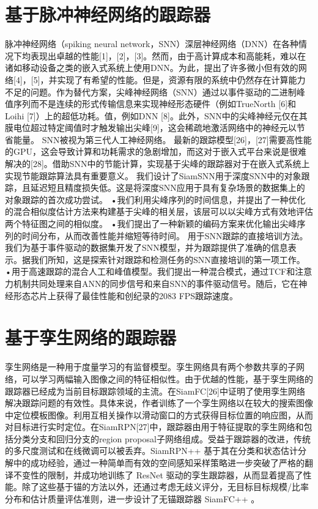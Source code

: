 \section{基于脉冲神经网络的跟踪器}%
脉冲神经网络（spiking neural network，SNN）深层神经网络（DNN）在各种情况下均表现出卓越的性能[1]，[2]，[3]。然而，由于高计算成本和高能耗，难以在诸如移动设备之类的嵌入式系统上使用DNN。为此，提出了许多微小但有效的网络[4]，[5]，并实现了有希望的性能。但是，资源有限的系统中仍然存在计算能力不足的问题。作为替代方案，尖峰神经网络（SNN）通过以事件驱动的二进制峰值序列而不是连续的形式传输信息来实现神经形态硬件（例如TrueNorth [6]和Loihi [7]）上的超低功耗。值，例如DNN [8]。此外，SNN中的尖峰神经元仅在其膜电位超过特定阈值时才触发输出尖峰[9]，这会稀疏地激活网络中的神经元以节省能量。 SNN被视为第三代人工神经网络。
最新的跟踪模型[26]，[27]需要高性能的GPU，这会导致计算和功耗需求的急剧增加，而这对于嵌入式平台来说是很难解决的[28]。借助SNN中的节能计算，实现基于尖峰的跟踪器对于在嵌入式系统上实现节能跟踪算法具有重要意义。\cite{SiamSNN} 我们设计了SiamSNN用于深度SNN中的对象跟踪，且延迟短且精度损失低。这是将深度SNN应用于具有复杂场景的数据集上的对象跟踪的首次成功尝试。 •我们利用尖峰序列的时间信息，并提出了一种优化的混合相似度估计方法来构建基于尖峰的相关层，该层可以以尖峰方式有效地评估两个特征图之间的相似度。 •我们提出了一种新颖的编码方案来优化输出尖峰序列的时间分布，从而改善性能并缩短等待时间。
\cite{DashNet} 用于SNN跟踪的直接培训方法。我们为基于事件驱动的数据集开发了SNN模型，并为跟踪提供了准确的信息表示。据我们所知，这是探索针对跟踪和检测任务的SNN直接培训的第一项工作。 •用于高速跟踪的混合人工和峰值模型。我们提出一种混合模式，通过TCF和注意力机制共同处理来自ANN的同步信号和来自SNN的事件驱动信号。随后，它在神经形态芯片上获得了最佳性能和创纪录的2083 FPS跟踪速度。%
\section{基于孪生网络的跟踪器}
孪生网络是一种用于度量学习的有监督模型。孪生网络具有两个参数共享的子网络，可以学习两幅输入图像之间的特征相似性。由于优越的性能，基于孪生网络的跟踪器已经成为当前目标跟踪领域的主流。在SiamFC[26]中证明了使用孪生网络解决跟踪问题的有效性。具体来说，作者训练了一个孪生网络以在较大的搜索图像中定位模板图像。利用互相关操作以滑动窗口的方式获得目标位置的响应图，从而对目标进行实时定位。在SiamRPN[27]中，跟踪器由用于特征提取的孪生网络和包括分类分支和回归分支的region proposal子网络组成。受益于跟踪器的改进，传统的多尺度测试和在线微调可以被丢弃。SiamRPN++ \cite{SiamRPN++} 基于其在分类和状态估计分解中的成功经验，通过一种简单而有效的空间感知采样策略进一步突破了严格的翻译不变性的限制，并成功地训练了 ResNet 驱动的孪生跟踪器，从而显着提高了性能。除了这些基于锚的方法以外，还通过考虑无歧义评分，无目标目标规模/比率分布和估计质量评估准则，进一步设计了无锚跟踪器 SiamFC++ \cite{SiamFC++}。
